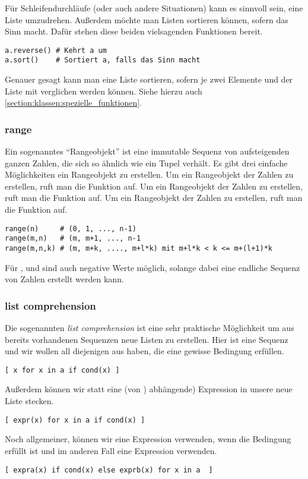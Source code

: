 Für Schleifendurchläufe (oder auch andere Situationen) kann es sinnvoll sein, eine Liste umzudrehen.
Außerdem möchte man Listen sortieren können, sofern das Sinn macht.
Dafür stehen diese beiden vielsagenden Funktionen bereit.
\begin{lstlisting}
a.reverse() # Kehrt a um
a.sort()    # Sortiert a, falls das Sinn macht
\end{lstlisting}
Genauer gesagt kann man eine Liste sortieren, sofern je zwei Elemente  und  der Liste mit  verglichen werden können.
Siehe hierzu auch \ref{section:klassen:spezielle_funktionen}.


\subsubsection{range}
\label{section:std_data_types:sequenzen:range}
Ein sogenanntes ``Rangeobjekt'' ist eine immutable Sequenz von aufsteigenden ganzen Zahlen, die sich so ähnlich wie ein Tupel verhält.
Es gibt drei einfache Möglichkeiten ein Rangeobjekt zu erstellen.
Um ein Rangeobjekt der Zahlen  zu erstellen, ruft man die Funktion  auf.
Um ein Rangeobjekt der Zahlen  zu erstellen, ruft man die Funktion  auf.
Um ein Rangeobjekt der Zahlen  zu erstellen, ruft man die Funktion  auf.
\begin{lstlisting}
range(n)     # (0, 1, ..., n-1)
range(m,n)   # (m, m+1, ..., n-1
range(m,n,k) # (m, m+k, ...., m+l*k) mit m+l*k < k <= m+(l+1)*k
\end{lstlisting}
Für ,  und  sind auch negative Werte möglich, solange dabei eine endliche Sequenz von Zahlen erstellt werden kann.


\subsubsection{list comprehension}
\label{section:std_data_types:sequenzen:list_comprehension}
Die sogenannten \emph{list comprehension} ist eine sehr praktische Möglichkeit um aus bereits vorhandenen Sequenzen neue Listen zu erstellen.
Hier ist  eine Sequenz und wir wollen all diejenigen  aus  haben, die eine gewisse Bedingung  erfüllen.
\begin{lstlisting}
[ x for x in a if cond(x) ]
\end{lstlisting}
Außerdem können wir statt  eine (von ) abhängende) Expression  in unsere neue Liste stecken.
\begin{lstlisting}
[ expr(x) for x in a if cond(x) ]
\end{lstlisting}
Noch allgemeiner, können wir eine Expression  verwenden, wenn die Bedingung  erfüllt ist und im anderen Fall eine Expression  verwenden.
\begin{lstlisting}
[ expra(x) if cond(x) else exprb(x) for x in a  ]
\end{lstlisting}

